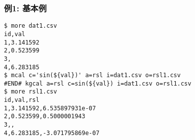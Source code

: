 \subsubsection*{例1: 基本例}



\begin{Verbatim}[baselinestretch=0.7,frame=single]
$ more dat1.csv
id,val
1,3.141592
2,0.523599
3,
4,6.283185
$ mcal c='sin(${val})' a=rsl i=dat1.csv o=rsl1.csv
#END# kgcal a=rsl c=sin(${val}) i=dat1.csv o=rsl1.csv
$ more rsl1.csv
id,val,rsl
1,3.141592,6.535897931e-07
2,0.523599,0.5000001943
3,,
4,6.283185,-3.071795869e-07
\end{Verbatim}
